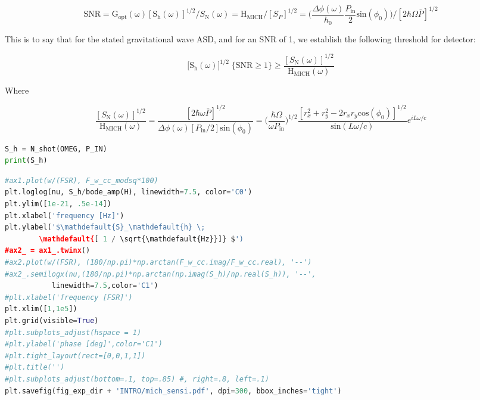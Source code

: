 \begin{equation}\mathrm{SNR} = \mathrm{G_{opt}(\omega)} [\mathrm{S}_{\mathrm{h}}(\omega)]^{1/2} / S_\mathrm{N}(\omega) = \mathrm{H}_\mathrm{MICH} / [S_P]^{1/2} = \bigg( \frac{\Delta \phi(\omega)}{h_0} \frac{P_\mathrm{in}}{2}\mathrm{sin}(\phi_0) \bigg) \bigg/ [2 \hbar \Omega \bar{P}]^{1/2}\end{equation}

This is to say that for the stated gravitational wave ASD, and for an
SNR of 1, we establish the following threshold for detector:

\begin{equation}\big[ \mathrm{S}_{\mathrm{h}}(\omega) \big]^{1/2} \; \{\mathrm{SNR}\geq1\} \geq \frac{ [S_\mathrm{N}(\omega)]^{1/2}}{\mathrm{H}_\mathrm{MICH}(\omega)}\end{equation}

Where

\begin{equation}\frac{ [S_\mathrm{N}(\omega)]^{1/2}}{\mathrm{H}_\mathrm{MICH}(\omega)} = \frac{[2 \hbar \omega \bar{P}]^{1/2}}{ \Delta \phi(\omega) [P_\mathrm{in} / 2]  \mathrm{sin}(\phi_0)} = \bigg( \frac{\hbar \Omega }{\omega P_\mathrm{in}} \bigg)^{1/2} \frac{[r_x^2 + r_y^2 -  2r_x r_y\mathrm{cos}(\phi_0)]^{1/2}}{\mathrm{sin}(L \omega / c)} e^{iL \omega / c}\end{equation}

\begin{spacing}{1} \begin{lstlisting}[frame=single, language=Python]
S_h = N_shot(OMEG, P_IN) 
print(S_h)
\end{lstlisting} \end{spacing}

\begin{spacing}{1} \begin{lstlisting}[frame=single, language=Python]
#ax1.plot(w/(FSR), F_w_cc_modsq*100)
plt.loglog(nu, S_h/bode_amp(H), linewidth=7.5, color='C0')
plt.ylim([1e-21, .5e-14])
plt.xlabel('frequency [Hz]')
plt.ylabel('$\mathdefault{S}_\mathdefault{h} \;  
	    \mathdefault{[ 1 / \sqrt{\mathdefault{Hz}}]} $')
#ax2_ = ax1_.twinx()
#ax2.plot(w/(FSR), (180/np.pi)*np.arctan(F_w_cc.imag/F_w_cc.real), '--')
#ax2_.semilogx(nu,(180/np.pi)*np.arctan(np.imag(S_h)/np.real(S_h)), '--', 
	       linewidth=7.5,color='C1')
#plt.xlabel('frequency [FSR]')
plt.xlim([1,1e5])
plt.grid(visible=True)
#plt.subplots_adjust(hspace = 1)
#plt.ylabel('phase [deg]',color='C1')
#plt.tight_layout(rect=[0,0,1,1])
#plt.title('')
#plt.subplots_adjust(bottom=.1, top=.85) #, right=.8, left=.1)
plt.savefig(fig_exp_dir + 'INTRO/mich_sensi.pdf', dpi=300, bbox_inches='tight')
\end{lstlisting} \end{spacing}

